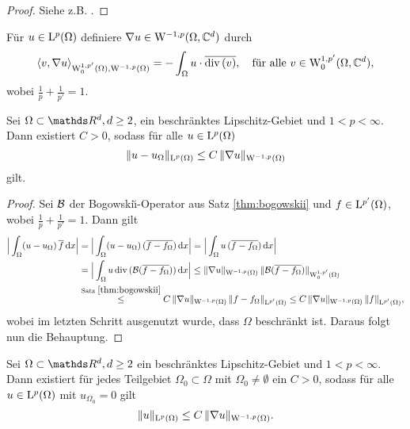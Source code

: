 \begin{proof}
  Siehe z.B. \cite[Seiten 161-172]{galdi}.
\end{proof}

Für $u \in \mathrm{L}^p(\Omega)$ definiere $\nabla u \in \mathrm{W}^{-1,p}(\Omega, \mathbb{C}^d)$ durch
$$
\langle v, \nabla u\rangle_{\mathrm{W}_0^{1,p'}(\Omega), \mathrm{W}^{-1,p}(\Omega)}
= -\int_\Omega u \cdot \overline{\mathrm{div\,} (v)}, \quad\text{für alle } v \in \mathrm{W}^{1,p'}_0(\Omega, \mathbb{C}^d),
$$
wobei $\frac{1}{p} + \frac{1}{p'} = 1$.

\begin{lem}
  \label{lem:poincare}
  Sei $\Omega \subset \R^d, d \geq 2$, ein beschränktes Lipschitz-Gebiet und $1 < p< \infty$.
  Dann existiert $C > 0$, sodass für alle $u \in \mathrm{L}^p(\Omega)$
  $$
  \| u - u_\Omega\|_{\mathrm{L}^p(\Omega)} \leq C\, \| \nabla u\|_{\mathrm{W}^{-1,p}(\Omega)}
  $$
  gilt.
\end{lem}

\begin{proof}
  Sei $\mathcal{B}$ der Bogowski\u{\i}-Operator aus Satz \ref{thm:bogowskii} und $f \in \mathrm{L}^{p'}(\Omega)$, wobei $\frac{1}{p} + \frac{1}{p'} = 1$.
  Dann gilt
  \begin{align*}
  \Big| \int_\Omega (u - u_\Omega) \, \overline f \, {\operatorname{d}\!{x}} \Big|
    &= \Big| \int_\Omega (u - u_\Omega) \, (\overline{f - f_\Omega})  \, {\operatorname{d}\!{x}} \Big|
    = \Big| \int_\Omega u \, (\overline{f - f_\Omega}) \, {\operatorname{d}\!{x}} \Big| \\
    &= \Big| \int_\Omega u \, \mathrm{div\,} ( \mathcal{B}(\overline{f - f_\Omega}) ) \, {\operatorname{d}\!{x}} \Big|
    \leq \|\nabla u\|_{\mathrm{W}^{-1,p}(\Omega)} \, \|\mathcal{B}(\overline{f - f_\Omega}) \|_{\mathrm{W}_0^{1,p'}(\Omega)} \\
    &\overset{\text{Satz } \ref{thm:bogowskii}}{\leq}  C \,  \|\nabla u\|_{\mathrm{W}^{-1,p}(\Omega)} \, \|f - f_\Omega\|_{\mathrm{L}^{p'}(\Omega)}
    \leq C \, \|\nabla u\|_{\mathrm{W}^{-1,p}(\Omega)} \, \|f\|_{\mathrm{L}^{p'}(\Omega)},
  \end{align*}
  wobei im letzten Schritt ausgenutzt wurde, dass $\Omega$ beschränkt ist.
  Daraus folgt nun die Behauptung.
\end{proof}

\begin{lem}
  \label{lem:poincare2}
  Sei $\Omega \subset \R^d, d\geq 2$ ein beschränktes Lipschitz-Gebiet und $1 < p < \infty$.
  Dann existiert für jedes Teilgebiet $\Omega_0 \subset \Omega$ mit $\Omega_0 \neq \emptyset$ ein $C > 0$, sodass für alle $u \in \mathrm{L}^p(\Omega)$ mit $u_{\Omega_0} = 0$ gilt
  $$
  \|u \|_{\mathrm{L}^p(\Omega)} \leq C \, \| \nabla u \|_{\mathrm{W}^{-1,p}(\Omega)}.
  $$
\end{lem}

